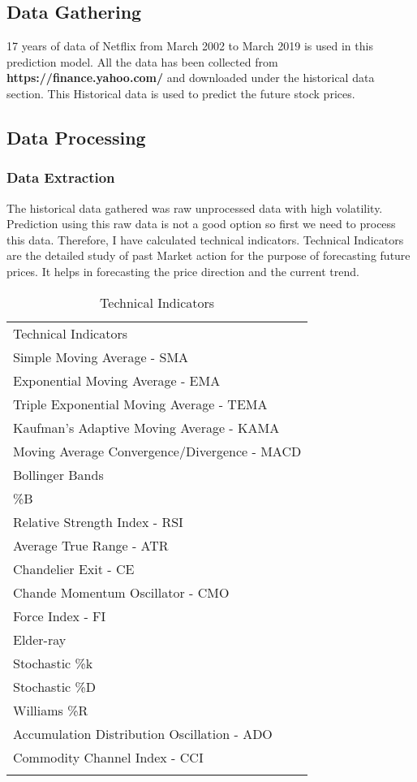\documentclass[5p,,preprint,12pt,twocolumn]{elsarticle}
\def\tblbottomrule{\noalign{\vspace*{6pt}}\hline\noalign{\vspace*{2pt}}}
\def\tblmidrule{\noalign{\vspace*{6pt}}\hline\noalign{\vspace*{2pt}}}
\begin{document}
\subsection{Data Gathering}17 years of data of Netflix from March 2002 to March 2019 is used in this prediction model. All the data has been collected from \textbf{https://finance.yahoo.com/ }and downloaded under the historical data section. This Historical data is used to predict the future stock prices. 



\subsection{Data Processing}



\subsubsection{Data Extraction}The historical data gathered was raw unprocessed data with high volatility. Prediction using this raw data is not a good option so first we need to process this data. Therefore, I have calculated technical indicators. Technical Indicators are the detailed study of past Market action for the purpose of forecasting future prices. It helps in forecasting the price direction and the current trend. 


\begin{table}[!htbp]
\caption{{Technical Indicators} }
\label{tw-932810d9e099}
\def\arraystretch{1}
\ignorespaces 
\centering 
\begin{tabulary}{\linewidth}{L}
\hline 
Technical Indicators\\
\tblmidrule 
Simple Moving Average - SMA\\
Exponential Moving Average - EMA\\
Triple Exponential Moving Average - TEMA\\
Kaufman's Adaptive Moving Average - KAMA\\
Moving Average Convergence/Divergence - MACD\\
Bollinger Bands\\
\%B\\
Relative Strength Index - RSI\\
Average True Range - ATR\\
Chandelier Exit  - CE\\
Chande Momentum Oscillator - CMO\\
Force Index - FI\\
Elder-ray \\
Stochastic \%k \\
Stochastic \%D \\
Williams \%R\\
Accumulation Distribution Oscillation - ADO\\
Commodity Channel Index - CCI\\
\tblbottomrule 
\end{tabulary}\par 
\end{table}
\end{document}

